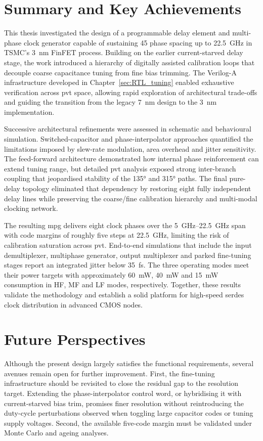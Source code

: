 \section{Summary and Key Achievements}
This thesis investigated the design of a programmable delay element and multi-phase clock generator capable of sustaining 45\degree{} phase spacing up to \SI{22.5}{\giga\hertz} in TSMC's \SI{3}{\nano\metre} FinFET process. Building on the earlier current-starved delay stage, the work introduced a hierarchy of digitally assisted calibration loops that decouple coarse capacitance tuning from fine bias trimming. The Verilog-A infrastructure developed in Chapter~\ref{sec:RTL_tuning} enabled exhaustive verification across \gls{pvt} space, allowing rapid exploration of architectural trade-offs and guiding the transition from the legacy 7~nm design to the 3~nm implementation.

Successive architectural refinements were assessed in schematic and behavioural simulation. Switched-capacitor and phase-interpolator approaches quantified the limitations imposed by slew-rate modulation, area overhead and jitter sensitivity. The feed-forward architecture demonstrated how internal phase reinforcement can extend tuning range, but detailed \gls{pvt} analysis exposed strong inter-branch coupling that jeopardised stability of the \ang{135} and \ang{315} paths. The final pure-delay topology eliminated that dependency by restoring eight fully independent delay lines while preserving the coarse/fine calibration hierarchy and multi-modal clocking network.

The resulting \gls{mpg} delivers eight clock phases over the \SI{5}{\giga\hertz}--\SI{22.5}{\giga\hertz} span with code margins of roughly five steps at 22.5~GHz, limiting the risk of calibration saturation across \gls{pvt}. End-to-end simulations that include the input demultiplexer, multiphase generator, output multiplexer and parked fine-tuning stages report an integrated jitter below \SI{35}{\femto\second}. The three operating modes meet their power targets with approximately \SI{60}{\milli\watt}, \SI{40}{\milli\watt} and \SI{15}{\milli\watt} consumption in HF, MF and LF modes, respectively. Together, these results validate the methodology and establish a solid platform for high-speed \gls{serdes} clock distribution in advanced CMOS nodes.

\section{Future Perspectives}
Although the present design largely satisfies the functional requirements, several avenues remain open for further improvement. First, the fine-tuning infrastructure should be revisited to close the residual gap to the resolution target. Extending the phase-interpolator control word, or hybridising it with current-starved bias trim, promises finer resolution without reintroducing the duty-cycle perturbations observed when toggling large capacitor codes or tuning supply voltages. Second, the available five-code margin must be validated under Monte Carlo and ageing analyses.

